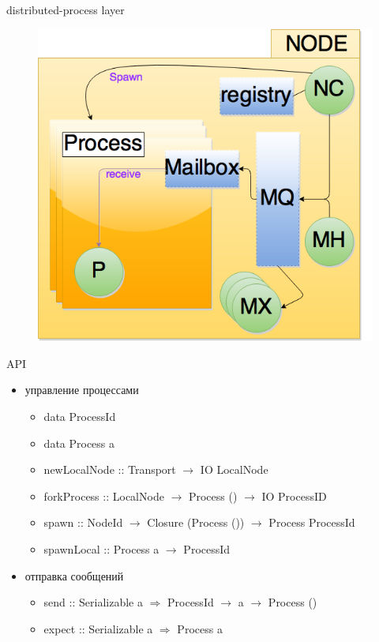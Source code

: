 \documentclass{beamer}
\begin{document}
\begin{frame}{distributed-process layer}
 \begin{figure}
   \includegraphics[height=0.85\paperheight]{images/c-h-d-p.png}
 \end{figure}
\end{frame}

\begin{frame}{API}
  \begin{itemize}
    \item управление процессами
    \begin{itemize}
      \item data ProcessId
      \item data Process a
      \item newLocalNode :: Transport $\rightarrow$ IO LocalNode
      \item forkProcess :: LocalNode $\rightarrow$ Process () $\rightarrow$ IO ProcessID
      \item spawn :: NodeId $\rightarrow$ Closure (Process ()) $\rightarrow$ Process ProcessId
      \item spawnLocal :: Process a $\rightarrow$ ProcessId
    \end{itemize}
    \item отправка сообщений
    \begin{itemize}
      \item send :: Serializable a $\Rightarrow$ ProcessId $\rightarrow$ a $\rightarrow$ Process ()
      \item expect :: Serializable a $\Rightarrow$ Process a
    \end{itemize}
  \end{itemize}
\end{frame}
\end{document}

